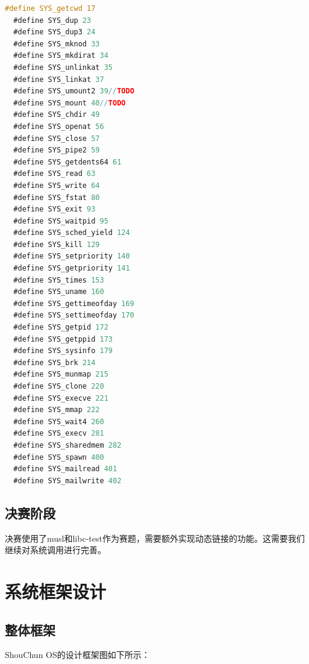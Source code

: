 \documentclass[UTF8,a4paper,10pt]{ctexart}
\begin{document}
\begin{lstlisting}[title=实现的系统调用及其系统调用号,frame=trbl,language={C}]
  #define SYS_getcwd 17
  #define SYS_dup 23
  #define SYS_dup3 24
  #define SYS_mknod 33
  #define SYS_mkdirat 34
  #define SYS_unlinkat 35
  #define SYS_linkat 37
  #define SYS_umount2 39//TODO
  #define SYS_mount 40//TODO
  #define SYS_chdir 49
  #define SYS_openat 56
  #define SYS_close 57
  #define SYS_pipe2 59
  #define SYS_getdents64 61
  #define SYS_read 63
  #define SYS_write 64
  #define SYS_fstat 80
  #define SYS_exit 93
  #define SYS_waitpid 95
  #define SYS_sched_yield 124
  #define SYS_kill 129
  #define SYS_setpriority 140
  #define SYS_getpriority 141
  #define SYS_times 153
  #define SYS_uname 160
  #define SYS_gettimeofday 169
  #define SYS_settimeofday 170
  #define SYS_getpid 172
  #define SYS_getppid 173
  #define SYS_sysinfo 179
  #define SYS_brk 214
  #define SYS_munmap 215
  #define SYS_clone 220
  #define SYS_execve 221
  #define SYS_mmap 222
  #define SYS_wait4 260
  #define SYS_execv 281
  #define SYS_sharedmem 282
  #define SYS_spawn 400
  #define SYS_mailread 401
  #define SYS_mailwrite 402
\end{lstlisting}

\subsection{决赛阶段}

决赛使用了musl和libc-test作为赛题，需要额外实现动态链接的功能。这需要我们
继续对系统调用进行完善。


\section{系统框架设计}

\subsection{整体框架}

ShouChun OS的设计框架图如下所示：
\end{document}
